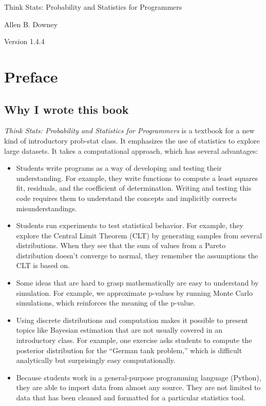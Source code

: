 \documentclass[12pt]{book}
\newcommand{\thetitle}{Think Stats: Probability and Statistics for Programmers}
\newcommand{\theversion}{1.4.4}
\begin{document}
\begin{htmlonly}


{\Large \thetitle}

{\large Allen B. Downey}

Version \theversion

\setcounter{chapter}{-1}

\end{htmlonly}


\chapter{Preface}
\label{preface}

\section*{Why I wrote this book}

{\em Think Stats: Probability and Statistics for Programmers} is a
textbook for a new kind of introductory prob-stat class.  
It emphasizes the use of statistics to explore large datasets.  It
takes a computational approach, which has several advantages:

\begin{itemize}

\item Students write programs as a way of developing and testing their
  understanding.  For example, they write functions to compute a least
  squares fit, residuals, and the coefficient of determination.
  Writing and testing this code requires them to understand the
  concepts and implicitly corrects misunderstandings.

\item Students run experiments to test statistical behavior.  For
  example, they explore the Central Limit Theorem (CLT) by generating
  samples from several distributions.  When they see that the sum of
  values from a Pareto distribution doesn't converge to normal, they
  remember the assumptions the CLT is based on.

\item Some ideas that are hard to grasp mathematically are easy to
  understand by simulation.  For example, we approximate p-values by
  running Monte Carlo simulations, which reinforces the meaning of the
  p-value.

\item Using discrete distributions and computation makes it possible
  to present topics like Bayesian estimation that are not usually
  covered in an introductory class.  For example, one exercise asks
  students to compute the posterior distribution for the ``German tank
  problem,'' which is difficult analytically but surprisingly easy
  computationally.

\item Because students work in a general-purpose programming language
  (Python), they are able to import data from almost any
  source.  They are not limited to data that has been cleaned and
  formatted for a particular statistics tool.

\end{itemize}
\end{document}
